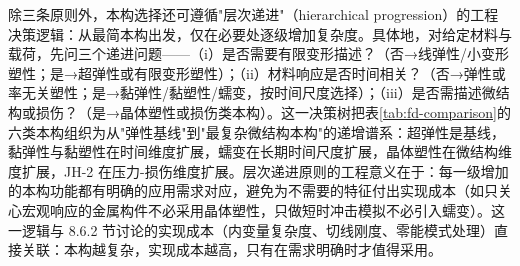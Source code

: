 除三条原则外，本构选择还可遵循"层次递进"（hierarchical progression）的工程决策逻辑：从最简本构出发，仅在必要处逐级增加复杂度。具体地，对给定材料与载荷，先问三个递进问题——（i）是否需要有限变形描述？（否→线弹性/小变形塑性；是→超弹性或有限变形塑性）；（ii）材料响应是否时间相关？（否→弹性或率无关塑性；是→黏弹性/黏塑性/蠕变，按时间尺度选择）；（iii）是否需描述微结构或损伤？（是→晶体塑性或损伤类本构）。这一决策树把表\ref{tab:fd-comparison}的六类本构组织为从"弹性基线"到"最复杂微结构本构"的递增谱系：超弹性是基线，黏弹性与黏塑性在时间维度扩展，蠕变在长期时间尺度扩展，晶体塑性在微结构维度扩展，JH-2 在压力-损伤维度扩展。层次递进原则的工程意义在于：每一级增加的本构功能都有明确的应用需求对应，避免为不需要的特征付出实现成本（如只关心宏观响应的金属构件不必采用晶体塑性，只做短时冲击模拟不必引入蠕变）。这一逻辑与 8.6.2 节讨论的实现成本（内变量复杂度、切线刚度、零能模式处理）直接关联：本构越复杂，实现成本越高，只有在需求明确时才值得采用。


